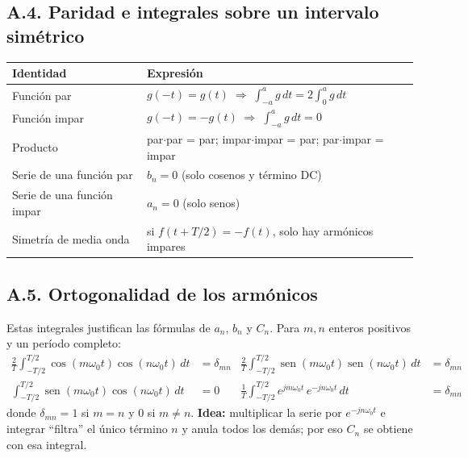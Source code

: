 \documentclass[11pt,a4paper]{article}
\DeclareMathOperator{\sen}{sen}
\begin{document}
\subsection*{A.4. Paridad e integrales sobre un intervalo simétrico}
\begin{table}[H]
\centering
\renewcommand{\arraystretch}{1.6}
\begin{tabularx}{\textwidth}{>{\raggedright\arraybackslash}p{4.4cm}X}
\toprule
\textbf{Identidad} & \textbf{Expresión}\\
\midrule
Función par & $g(-t)=g(t)\;\Rightarrow\;\displaystyle\int_{-a}^{a}g\,dt=2\int_{0}^{a}g\,dt$\\
Función impar & $g(-t)=-g(t)\;\Rightarrow\;\displaystyle\int_{-a}^{a}g\,dt=0$\\
Producto & par$\cdot$par = par; impar$\cdot$impar = par; par$\cdot$impar = impar\\
Serie de una función par & $b_n=0$ (solo cosenos y término DC)\\
Serie de una función impar & $a_n=0$ (solo senos)\\
Simetría de media onda & si $f(t+T/2)=-f(t)$, solo hay armónicos impares\\
\bottomrule
\end{tabularx}
\end{table}

\subsection*{A.5. Ortogonalidad de los armónicos}
Estas integrales justifican las fórmulas de $a_n$, $b_n$ y $C_n$. Para $m,n$ enteros
positivos y un período completo:
\begin{align*}
  \frac{2}{T}\int_{-T/2}^{T/2}\cos(m\omega_0t)\cos(n\omega_0t)\,dt&=\delta_{mn}
  &\frac{2}{T}\int_{-T/2}^{T/2}\sen(m\omega_0t)\sen(n\omega_0t)\,dt&=\delta_{mn}\\
  \int_{-T/2}^{T/2}\sen(m\omega_0t)\cos(n\omega_0t)\,dt&=0
  &\frac{1}{T}\int_{-T/2}^{T/2}e^{jm\omega_0t}\,e^{-jn\omega_0t}\,dt&=\delta_{mn}
\end{align*}
donde $\delta_{mn}=1$ si $m=n$ y $0$ si $m\neq n$. \textbf{Idea:} multiplicar la serie por
$e^{-jn\omega_0t}$ e integrar ``filtra'' el único término $n$ y anula todos los demás; por
eso $C_n$ se obtiene con esa integral.
\end{document}
